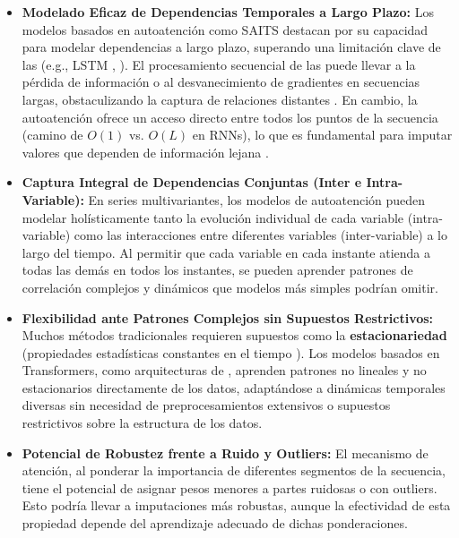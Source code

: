 \begin{itemize}
    \item \textbf{Modelado Eficaz de Dependencias Temporales a Largo Plazo:}
    Los modelos basados en autoatención como SAITS destacan por su capacidad para modelar dependencias a largo plazo, superando una limitación clave de las  (e.g., LSTM \citep{Hochreiter1997lstm},  \citep{Cho2014gru}). El procesamiento secuencial de las  puede llevar a la pérdida de información o al desvanecimiento de gradientes en secuencias largas, obstaculizando la captura de relaciones distantes \citep{Bengio1994learning, Pascanu2013difficulty}. En cambio, la autoatención ofrece un acceso directo entre todos los puntos de la secuencia (camino de $O(1)$ vs. $O(L)$ en RNNs), lo que es fundamental para imputar valores que dependen de información lejana \citep{Vaswani2017}.
    \item \textbf{Captura Integral de Dependencias Conjuntas (Inter e Intra-Variable):}
    En series multivariantes, los modelos de autoatención pueden modelar holísticamente tanto la evolución individual de cada variable (intra-variable) como las interacciones entre diferentes variables (inter-variable) a lo largo del tiempo. Al permitir que cada variable en cada instante atienda a todas las demás en todos los instantes, se pueden aprender patrones de correlación complejos y dinámicos que modelos más simples podrían omitir.

    \item \textbf{Flexibilidad ante Patrones Complejos sin Supuestos Restrictivos:}
    Muchos métodos tradicionales requieren supuestos como la \textbf{estacionariedad} (propiedades estadísticas constantes en el tiempo \citep{Box2015time}). Los modelos basados en Transformers, como arquitecturas de , aprenden patrones no lineales y no estacionarios directamente de los datos, adaptándose a dinámicas temporales diversas sin necesidad de preprocesamientos extensivos o supuestos restrictivos sobre la estructura de los datos.

    \item \textbf{Potencial de Robustez frente a Ruido y Outliers:}
    El mecanismo de atención, al ponderar la importancia de diferentes segmentos de la secuencia, tiene el potencial de asignar pesos menores a partes ruidosas o con outliers. Esto podría llevar a imputaciones más robustas, aunque la efectividad de esta propiedad depende del aprendizaje adecuado de dichas ponderaciones.
\end{itemize}

